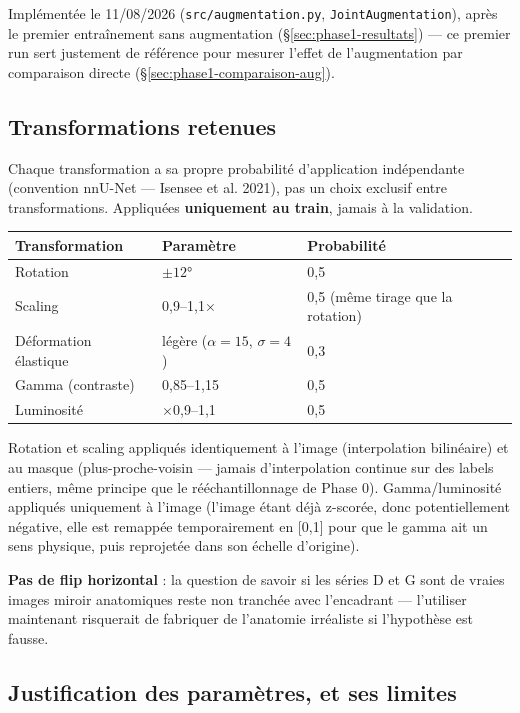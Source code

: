 Implémentée le 11/08/2026 (\texttt{src/augmentation.py}, \texttt{JointAugmentation}),
après le premier entraînement sans augmentation (\S\ref{sec:phase1-resultats}) --- ce
premier run sert justement de référence pour mesurer l'effet de l'augmentation par
comparaison directe (\S\ref{sec:phase1-comparaison-aug}).

\subsection{Transformations retenues}

Chaque transformation a sa propre probabilité d'application indépendante (convention
nnU-Net --- Isensee et al. 2021), pas un choix exclusif entre transformations.
Appliquées \textbf{uniquement au train}, jamais à la validation.

\begin{center}
\begin{tabular}{lll}
\toprule
Transformation & Paramètre & Probabilité \\
\midrule
Rotation & $\pm12°$ & 0,5 \\
Scaling & 0,9--1,1$\times$ & 0,5 (même tirage que la rotation) \\
Déformation élastique & légère ($\alpha=15$, $\sigma=4$) & 0,3 \\
Gamma (contraste) & 0,85--1,15 & 0,5 \\
Luminosité & $\times$0,9--1,1 & 0,5 \\
\bottomrule
\end{tabular}
\end{center}

Rotation et scaling appliqués identiquement à l'image (interpolation bilinéaire) et au
masque (plus-proche-voisin --- jamais d'interpolation continue sur des labels entiers,
même principe que le rééchantillonnage de Phase 0). Gamma/luminosité appliqués
uniquement à l'image (l'image étant déjà z-scorée, donc potentiellement négative, elle
est remappée temporairement en [0,1] pour que le gamma ait un sens physique, puis
reprojetée dans son échelle d'origine).

\textbf{Pas de flip horizontal} : la question de savoir si les séries D et G sont de
vraies images miroir anatomiques reste non tranchée avec l'encadrant --- l'utiliser
maintenant risquerait de fabriquer de l'anatomie irréaliste si l'hypothèse est fausse.

\subsection{Justification des paramètres, et ses limites}

